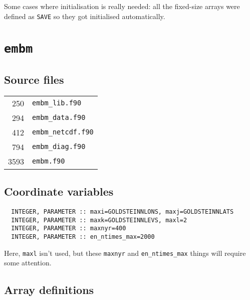 \documentclass[a4paper,10pt,article]{memoir}
\begin{document}
Some cases where initialisation is really needed: all the fixed-size
arrays were defined as \texttt{SAVE} so they got initialised
automatically.


\chapter{\texttt{embm}}

\section{Source files}

\begin{tabular}{rl}
   250 & \texttt{embm\_lib.f90} \\
   294 & \texttt{embm\_data.f90} \\
   412 & \texttt{embm\_netcdf.f90} \\
   794 & \texttt{embm\_diag.f90} \\
  3593 & \texttt{embm.f90} \\
\end{tabular}

\section{Coordinate variables}

\begin{verbatim}
  INTEGER, PARAMETER :: maxi=GOLDSTEINNLONS, maxj=GOLDSTEINNLATS
  INTEGER, PARAMETER :: maxk=GOLDSTEINNLEVS, maxl=2
  INTEGER, PARAMETER :: maxnyr=400
  INTEGER, PARAMETER :: en_ntimes_max=2000
\end{verbatim}

Here, \texttt{maxl} isn't used, but these \texttt{maxnyr} and
\texttt{en\_ntimes\_max} things will require some attention.

\section{Array definitions}
\end{document}
